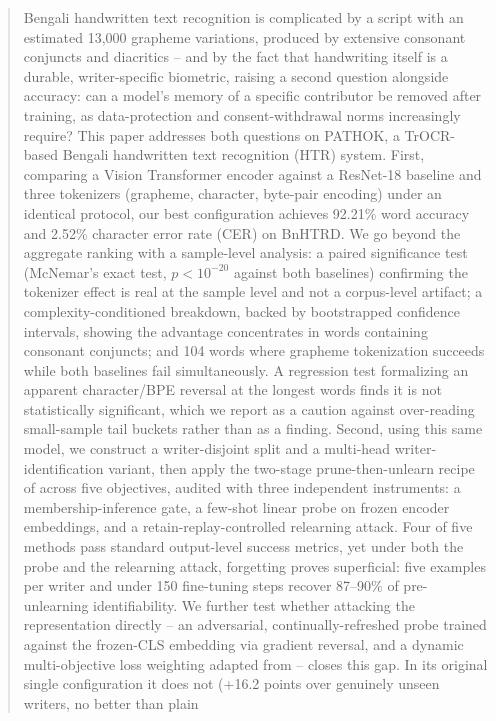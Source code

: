 \documentclass[a4paper,fleqn]{cas-dc}
\begin{document}
\begin{abstract}
Bengali handwritten text recognition is complicated by a script with an
estimated 13{,}000 grapheme variations, produced by extensive consonant
conjuncts and diacritics -- and by the fact that handwriting itself is a
durable, writer-specific biometric, raising a second question alongside
accuracy: can a model's memory of a specific contributor be removed after
training, as data-protection and consent-withdrawal norms increasingly
require? This paper addresses both questions on PATHOK, a TrOCR-based
Bengali handwritten text recognition (HTR) system. First, comparing a
Vision Transformer encoder against a ResNet-18 baseline and three
tokenizers (grapheme, character, byte-pair encoding) under an identical
protocol, our best configuration achieves 92.21\% word accuracy and 2.52\%
character error rate (CER) on BnHTRD. We go beyond the aggregate ranking
with a sample-level analysis: a paired significance test (McNemar's exact
test, $p<10^{-20}$ against both baselines) confirming the tokenizer effect
is real at the sample level and not a corpus-level artifact; a
complexity-conditioned breakdown, backed by bootstrapped confidence
intervals, showing the advantage concentrates in words containing
consonant conjuncts; and 104 words where grapheme tokenization succeeds
while both baselines fail simultaneously. A regression test formalizing an
apparent character/BPE reversal at the longest words finds it is not
statistically significant, which we report as a caution against
over-reading small-sample tail buckets rather than as a finding. Second,
using this same model, we construct a
writer-disjoint split and a multi-head writer-identification variant, then
apply the two-stage prune-then-unlearn recipe of \citet{kang2026privacy}
across five objectives, audited with three independent instruments: a
membership-inference gate, a few-shot linear probe on frozen encoder
embeddings, and a retain-replay-controlled relearning attack. Four of five
methods pass standard output-level success metrics, yet under both the
probe and the relearning attack, forgetting proves superficial: five
examples per writer and under 150 fine-tuning steps recover 87--90\% of
pre-unlearning identifiability. We further test whether attacking the
representation directly -- an adversarial, continually-refreshed probe
trained against the frozen-CLS embedding via gradient reversal, and a
dynamic multi-objective loss weighting adapted from \citet{wang2026rfuss}
-- closes this gap. In its original single configuration it does not
(+16.2 points over genuinely unseen writers, no better than plain

\end{abstract}
\end{document}

